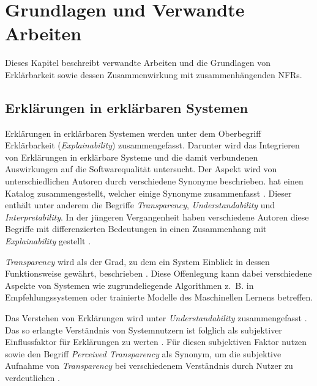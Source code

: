 \chapter{Grundlagen und Verwandte Arbeiten}

Dieses Kapitel beschreibt verwandte Arbeiten und die Grundlagen von Erklärbarkeit sowie dessen Zusammenwirkung mit zusammenhängenden NFRs.

\section{Erklärungen in erklärbaren Systemen}
\label{02_basics:explainable_system}

Erklärungen in erklärbaren Systemen werden unter dem Oberbegriff Erklärbarkeit (\textit{Explainability}) zusammengefasst. Darunter wird das Integrieren von Erklärungen in erklärbare Systeme und die damit verbundenen Auswirkungen auf die Softwarequalität untersucht. Der Aspekt wird von unterschiedlichen Autoren durch verschiedene Synonyme beschrieben. \citeauthor{brennen_what_2020} hat einen Katalog zusammengestellt, welcher einige Synonyme zusammenfasst \cite{brennen_what_2020}. Dieser enthält unter anderem die Begriffe
\textit{Transparency}, \textit{Understandability} und \textit{Interpretability}. In der jüngeren Vergangenheit haben verschiedene Autoren diese Begriffe mit differenzierten Bedeutungen in einen Zusammenhang mit \textit{Explainability} gestellt \cite{chazette_end-users_nodate,chazette_knowledge_nodate,kohl_explainability_2019,wang_integration_2020}.

\textit{Transparency} wird als der Grad, zu dem ein System Einblick in dessen Funktionsweise gewährt, beschrieben \cite{chazette_end-users_nodate}. Diese Offenlegung kann dabei verschiedene Aspekte von Systemen wie zugrundeliegende Algorithmen z.~B. in Empfehlungssystemen \cite{balog_measuring_2020} oder trainierte Modelle des Maschinellen Lernens \cite{sovrano_modelling_2020} betreffen.

Das Verstehen von Erklärungen wird unter \textit{Understandability} zusammengefasst \cite{do2010software}. Das so erlangte Verständnis von Systemnutzern ist folglich als subjektiver Einflussfaktor für Erklärungen zu werten \cite{chazette_end-users_nodate}. Für diesen subjektiven Faktor nutzen \citeauthor{wang_integration_2020} sowie \citeauthor{balog_measuring_2020} den Begriff \textit{Perceived Transparency} als Synonym, um die subjektive Aufnahme von \textit{Transparency} bei verschiedenem Verständnis durch Nutzer zu verdeutlichen \cite{wang_integration_2020, balog_measuring_2020}.

